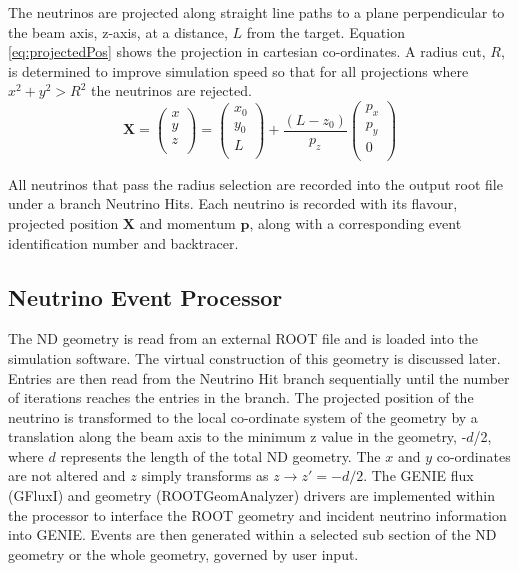The neutrinos are projected along straight line paths to a plane perpendicular to the beam axis, z-axis, at a distance, $L$ from the target. Equation \ref{eq:projectedPos} shows the projection in cartesian co-ordinates. A radius cut, $R$, is determined to improve simulation speed so that for all projections where $x^{2} + y^{2} > R^{2}$ the neutrinos are rejected. 
	\begin{equation}
		\textbf{X} =\begin{pmatrix}
  					x \\
  					y \\
  					z \\
			 \end{pmatrix} = \begin{pmatrix}
  					x_{0} \\
  					y _{0}\\
  					L \\
			 	\end{pmatrix} + \frac{(L-z_{0})}{p_{z}}\begin{pmatrix}
  					p_{x} \\
  					p_{y} \\
  					0 \\
			 		\end{pmatrix}
		\label{eq:projectedPos}
	\end{equation}
	
All neutrinos that pass the radius selection are recorded into the output root file under a branch Neutrino Hits. Each neutrino is recorded with its flavour, projected position $\textbf{X}$ and momentum $\textbf{p}$, along with a corresponding event identification number and backtracer.

\subsection{Neutrino Event Processor}
The ND geometry is read from an external ROOT file and is loaded into the simulation software. The virtual construction of this geometry is discussed later. Entries are then read from the Neutrino Hit branch sequentially until the number of iterations reaches the entries in the branch. The projected position of the neutrino is transformed to the local co-ordinate system of the geometry by a translation along the beam axis to the minimum z value in the geometry, -$d$/2, where $d$ represents the length of the total ND geometry. The $x$ and $y$ co-ordinates are not altered and $z$ simply transforms as $z \rightarrow z' = -d/2$. The GENIE flux (GFluxI) and geometry (ROOTGeomAnalyzer) drivers are implemented within the processor to interface the ROOT geometry and incident neutrino information into GENIE. Events are then generated within a selected sub section of the ND geometry or the whole geometry, governed by user input.

